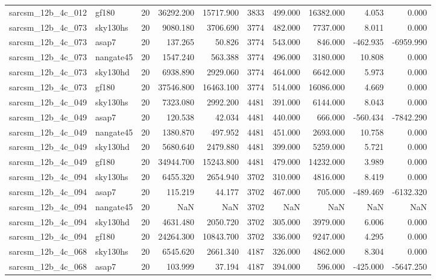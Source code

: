 \begin{tabular}{llrrrrrrrr}
sarcsm\_12b\_4c\_012 & gf180 & 20 & 36292.200 & 15717.900 & 3833 & 499.000 & 16382.000 & 4.053 & 0.000 \\
sarcsm\_12b\_4c\_073 & sky130hs & 20 & 9080.180 & 3706.690 & 3774 & 482.000 & 7737.000 & 8.011 & 0.000 \\
sarcsm\_12b\_4c\_073 & asap7 & 20 & 137.265 & 50.826 & 3774 & 543.000 & 846.000 & -462.935 & -6959.990 \\
sarcsm\_12b\_4c\_073 & nangate45 & 20 & 1547.240 & 563.388 & 3774 & 496.000 & 3180.000 & 10.808 & 0.000 \\
sarcsm\_12b\_4c\_073 & sky130hd & 20 & 6938.890 & 2929.060 & 3774 & 464.000 & 6642.000 & 5.973 & 0.000 \\
sarcsm\_12b\_4c\_073 & gf180 & 20 & 37546.800 & 16463.100 & 3774 & 514.000 & 16086.000 & 4.669 & 0.000 \\
sarcsm\_12b\_4c\_049 & sky130hs & 20 & 7323.080 & 2992.200 & 4481 & 391.000 & 6144.000 & 8.043 & 0.000 \\
sarcsm\_12b\_4c\_049 & asap7 & 20 & 120.538 & 42.034 & 4481 & 440.000 & 666.000 & -560.434 & -7842.290 \\
sarcsm\_12b\_4c\_049 & nangate45 & 20 & 1380.870 & 497.952 & 4481 & 451.000 & 2693.000 & 10.758 & 0.000 \\
sarcsm\_12b\_4c\_049 & sky130hd & 20 & 5680.640 & 2479.880 & 4481 & 399.000 & 5259.000 & 5.721 & 0.000 \\
sarcsm\_12b\_4c\_049 & gf180 & 20 & 34944.700 & 15243.800 & 4481 & 479.000 & 14232.000 & 3.989 & 0.000 \\
sarcsm\_12b\_4c\_094 & sky130hs & 20 & 6455.320 & 2654.940 & 3702 & 310.000 & 4816.000 & 8.419 & 0.000 \\
sarcsm\_12b\_4c\_094 & asap7 & 20 & 115.219 & 44.177 & 3702 & 467.000 & 705.000 & -489.469 & -6132.320 \\
sarcsm\_12b\_4c\_094 & nangate45 & 20 & NaN & NaN & 3702 & NaN & NaN & NaN & NaN \\
sarcsm\_12b\_4c\_094 & sky130hd & 20 & 4631.480 & 2050.720 & 3702 & 305.000 & 3979.000 & 6.006 & 0.000 \\
sarcsm\_12b\_4c\_094 & gf180 & 20 & 24264.300 & 10843.700 & 3702 & 336.000 & 9247.000 & 4.295 & 0.000 \\
sarcsm\_12b\_4c\_068 & sky130hs & 20 & 6545.620 & 2661.340 & 4187 & 326.000 & 4862.000 & 8.304 & 0.000 \\
sarcsm\_12b\_4c\_068 & asap7 & 20 & 103.999 & 37.194 & 4187 & 394.000 & 596.000 & -425.000 & -5647.250 \\

\end{tabular}
